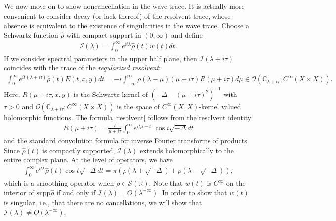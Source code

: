 \documentclass[11pt,letterpaper,oneside]{amsart}
\newcommand{\C}{\mathbb{C}}
\newcommand{\R}{\mathbb{R}}
\newcommand{\supp}{\text{supp}}
\theoremstyle{definition}
\theoremstyle{remark}
\newcommand{\wh}{\widehat}
\newcommand{\I}{\mathcal{I}}
\theoremstyle{definition}
\theoremstyle{remark}
\begin{document}
We now move on to show noncancellation in the wave trace. It is actually more convenient to consider decay (or lack thereof) of the resolvent trace, whose absence is equivalent to the existence of singularities in the wave trace. Choose a Schwartz function $\wh \rho$ with compact support in $(0, \infty)$ and define
\begin{align*}
    \I(\lambda) = \int_0^\infty e^{i t \lambda} \wh \rho(t) w(t) dt.
\end{align*}
If we consider spectral parameters in the upper half plane, then $\I(\lambda + i \tau)$ coincides with the trace of the \textit{regularized resolvent}:
\begin{align}\label{resolvent}
    \int_0^\infty e^{i t (\lambda + i \tau)} \wh \rho(t) E(t,x,y) dt = - i \int_{- \infty}^\infty \rho(\lambda - \mu) (\mu + i \tau) R(\mu + i \tau) d \mu \in \mathcal{O} \left(\C_{\lambda + i \tau}; C^\infty( X \times X) \right).
\end{align}
Here, $R(\mu + i \tau,x,y)$ is the Schwartz kernel of $(- \Delta - (\mu + i \tau)^2)^{-1}$ with $\tau > 0$ and $\mathcal{O}\left(\C_{\lambda + i \tau}; C^\infty( X \times X) \right)$ is the space of $C^\infty(X,X)$-kernel valued holomorphic functions. The formula \eqref{resolvent} follows from the resolvent identity
\begin{align*}
    R(\mu+i \tau) = \frac{i}{\mu+i \tau} \int_0^\infty e^{i t \mu - t \tau} \cos t \sqrt{-\Delta} dt
\end{align*}
and the standard convolution formula for inverse Fourier transforms of products. Since $\wh \rho(t)$ is compactly supported, $\I(\lambda)$ extends holomorphically to the entire complex plane. At the level of operators, we have
\begin{align*}
    \int_0^\infty e^{i t \lambda} \wh \rho(t) \cos t \sqrt{-\Delta} dt = \pi \left( \rho(\lambda + \sqrt{-\Delta})  + \rho(\lambda - \sqrt{-\Delta}) \right),
\end{align*}
which is a smoothing operator when $\rho \in \mathscr{S}(\R)$. Note that $w(t)$ is $C^\infty$ on the interior of $\supp \wh \rho$ if and only if $\I(\lambda) = O(\lambda^{-\infty})$. In order to show that $w(t)$ is singular, i.e., that there are no cancellations, we will show that $\I(\lambda) \neq O(\lambda^{-\infty})$.
\end{document}
